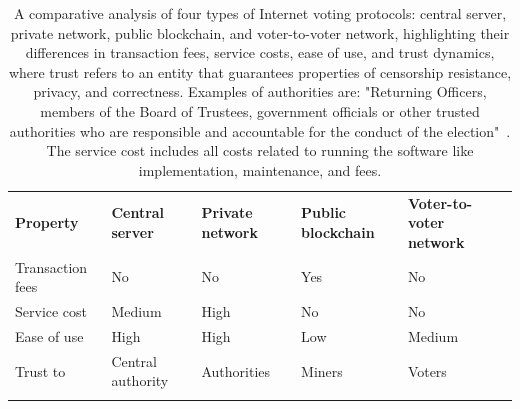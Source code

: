 \documentclass[runningheads]{llncs}
\begin{document}
\newcommand{\fullmoon}{\tikz\filldraw[fill=black] (0,0) circle (0.5em);}
\newcommand{\newmoon}{\tikz\draw (0,0) circle (0.5em);}
\newcommand{\rightmoon}{\tikz\draw (0,0) circle (0.5em); \filldraw[fill=black] (0,0) arc (90:270:0.5em) -- cycle;}
\newcommand{\leftmoon}{\tikz\draw (0,0) circle (0.5em); \filldraw[fill=black] (0,0) arc (270:90:0.5em) -- cycle;}
\newcommand{\halfmoon}{\tikz\draw (0,0) circle (0.5em); \filldraw[fill=black] (0,-0.5em) rectangle (0,0.5em);}


\begin{table}[!h]
\centering
\newcommand{\YES}{\cellcolor{red!50}Yes}
\newcommand{\NO}{\cellcolor{green!50}No}
\begin{tabular}{p{}p{}p{}p{}p{}}
\noalign{\smallskip}\hline\noalign{\smallskip}
\textbf{Property} & \textbf{Central server} & \textbf{Private network} & \textbf{Public blockchain} & \textbf{Voter-to-voter network}\\
\noalign{\smallskip}\hline\noalign{\smallskip}
Transaction fees & \NO & \NO & \YES & \NO \\
\hline
Service cost & \cellcolor{yellow!50} Medium & \cellcolor{red!50} High & \cellcolor{green!50} No  & \cellcolor{green!50} No \\
\hline
Ease of use & \cellcolor{green!50} High & \cellcolor{green!50}High & \cellcolor{red!50} Low & \cellcolor{yellow!50} Medium \\
\hline
Trust to & \cellcolor{red!50} Central authority & \cellcolor{yellow!50} Authorities & \cellcolor{yellow!50} Miners & \cellcolor{yellow!50} Voters  \\
\noalign{\smallskip}\hline
\hline
\end{tabular}

\caption{A comparative analysis of four types of Internet voting protocols: central server, private network, public blockchain, and voter-to-voter network, highlighting their differences in transaction fees, service costs, ease of use, and trust dynamics, where trust refers to an entity that guarantees properties of censorship resistance, privacy, and correctness. Examples of authorities are: "Returning Officers, members of the Board of Trustees, government officials or other trusted authorities who are responsible and accountable for the conduct of the election"~\cite{benalohElectionGuardDesignSpecification2023}. The service cost includes all costs related to running the software like implementation, maintenance, and fees.}
\label{table-comparision}

\end{table}
\end{document}
